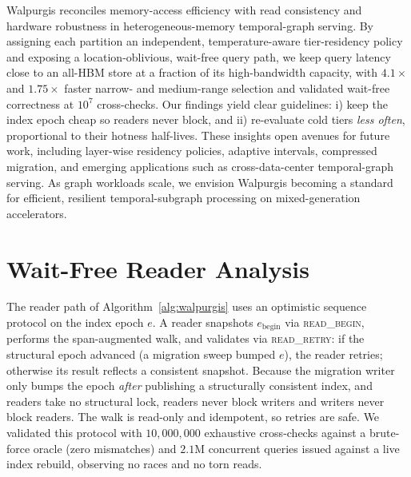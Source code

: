 \documentclass{article}
\begin{document}
Walpurgis reconciles memory-access efficiency with read consistency and hardware
robustness in heterogeneous-memory temporal-graph serving. By assigning each partition an
independent, temperature-aware tier-residency policy and exposing a location-oblivious,
wait-free query path, we keep query latency close to an all-HBM store at a fraction of its
high-bandwidth capacity, with $4.1\times$ and $1.75\times$ faster narrow- and
medium-range selection and validated wait-free correctness at $10^{7}$ cross-checks. Our
findings yield clear guidelines: i) keep the index epoch cheap so readers never block,
and ii) re-evaluate cold tiers \emph{less often}, proportional to their hotness
half-lives. These insights open avenues for future work, including layer-wise residency
policies, adaptive intervals, compressed migration, and emerging applications such as
cross-data-center temporal-graph serving. As graph workloads scale, we envision Walpurgis
becoming a standard for efficient, resilient temporal-subgraph processing on
mixed-generation accelerators.

\appendix
\section{Wait-Free Reader Analysis}
\label{app:waitfree}

The reader path of Algorithm~\ref{alg:walpurgis} uses an optimistic sequence protocol on
the index epoch $e$. A reader snapshots $e_{\mathrm{begin}}$ via \textsc{read\_begin},
performs the span-augmented walk, and validates via \textsc{read\_retry}: if the
structural epoch advanced (a migration sweep bumped $e$), the reader retries; otherwise
its result reflects a consistent snapshot. Because the migration writer only bumps the
epoch \emph{after} publishing a structurally consistent index, and readers take no
structural lock, readers never block writers and writers never block readers. The walk is
read-only and idempotent, so retries are safe. We validated this protocol with
$10{,}000{,}000$ exhaustive cross-checks against a brute-force oracle (zero mismatches)
and $2.1$M concurrent queries issued against a live index rebuild, observing no races and
no torn reads.
\end{document}

